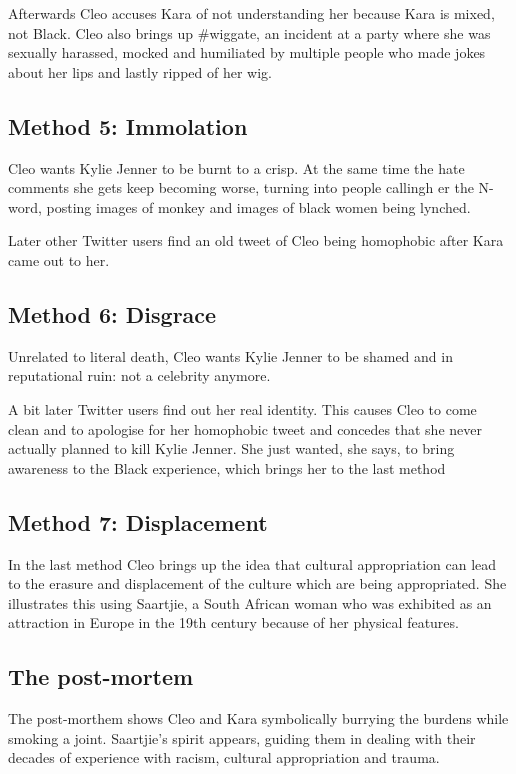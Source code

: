 \documentclass{article}
\begin{document}
Afterwards Cleo accuses Kara of not understanding her because Kara is mixed, not  Black. Cleo also brings up \#wiggate, an incident at a party where she was sexually harassed, mocked and humiliated by multiple people who made jokes about her lips and lastly ripped of her wig.
 
\subsection{Method 5: Immolation}
Cleo wants Kylie Jenner to be burnt to a crisp. At the same time the hate comments she gets keep becoming worse, turning into people callingh er the N-word, posting images of monkey and images of black women being lynched.
 
Later other Twitter users find an old tweet of Cleo being homophobic after Kara came out to her. 
 
\subsection{Method 6: Disgrace}
Unrelated to literal death, Cleo wants Kylie Jenner to be shamed and in reputational ruin: not a celebrity anymore.
 
A bit later Twitter users find out her real identity. This causes Cleo to come clean and to apologise for her homophobic tweet and concedes that she never actually planned to kill Kylie Jenner. She just wanted, she says, to bring awareness to the Black experience, which brings her to the last method
 
\subsection{Method 7: Displacement} 
In the last method Cleo brings up the idea that cultural appropriation can lead to the erasure and displacement of the culture which are being appropriated. She illustrates this using Saartjie, a South African woman who was exhibited as an attraction in Europe in the 19th century because of her physical features.
 
\subsection{The post-mortem} 
The post-morthem shows Cleo and Kara symbolically burrying the burdens while smoking a joint. Saartjie's spirit appears, guiding them in dealing with their decades of experience with racism, cultural appropriation and trauma. 
 
\end{document}
